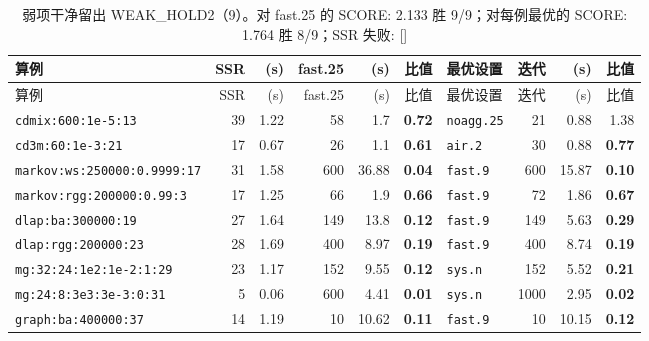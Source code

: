 {\scriptsize\setlength{\tabcolsep}{3pt}
\begin{longtable}{lrrrrrlrrr}
\caption{弱项干净留出 WEAK\_HOLD2（9）。对 fast.25 的 SCORE: 2.133  胜 9/9；对每例最优的 SCORE: 1.764  胜 8/9；SSR 失败: []}\\
\toprule
算例 & SSR & (s) & fast.25 & (s) & 比值 & 最优设置 & 迭代 & (s) & 比值 \\
\midrule
\endfirsthead
\toprule
算例 & SSR & (s) & fast.25 & (s) & 比值 & 最优设置 & 迭代 & (s) & 比值 \\
\midrule
\endhead
\bottomrule
\endlastfoot
\texttt{cdmix:600:1e-5:13} & 39 & 1.22 & 58 & 1.7 & \textbf{0.72} & \texttt{noagg.25} & 21 & 0.88 & 1.38 \\
\texttt{cd3m:60:1e-3:21} & 17 & 0.67 & 26 & 1.1 & \textbf{0.61} & \texttt{air.2} & 30 & 0.88 & \textbf{0.77} \\
\texttt{markov:ws:250000:0.9999:17} & 31 & 1.58 & 600 & 36.88 & \textbf{0.04} & \texttt{fast.9} & 600 & 15.87 & \textbf{0.10} \\
\texttt{markov:rgg:200000:0.99:3} & 17 & 1.25 & 66 & 1.9 & \textbf{0.66} & \texttt{fast.9} & 72 & 1.86 & \textbf{0.67} \\
\texttt{dlap:ba:300000:19} & 27 & 1.64 & 149 & 13.8 & \textbf{0.12} & \texttt{fast.9} & 149 & 5.63 & \textbf{0.29} \\
\texttt{dlap:rgg:200000:23} & 28 & 1.69 & 400 & 8.97 & \textbf{0.19} & \texttt{fast.9} & 400 & 8.74 & \textbf{0.19} \\
\texttt{mg:32:24:1e2:1e-2:1:29} & 23 & 1.17 & 152 & 9.55 & \textbf{0.12} & \texttt{sys.n} & 152 & 5.52 & \textbf{0.21} \\
\texttt{mg:24:8:3e3:3e-3:0:31} & 5 & 0.06 & 600 & 4.41 & \textbf{0.01} & \texttt{sys.n} & 1000 & 2.95 & \textbf{0.02} \\
\texttt{graph:ba:400000:37} & 14 & 1.19 & 10 & 10.62 & \textbf{0.11} & \texttt{fast.9} & 10 & 10.15 & \textbf{0.12} \\
\end{longtable}}
